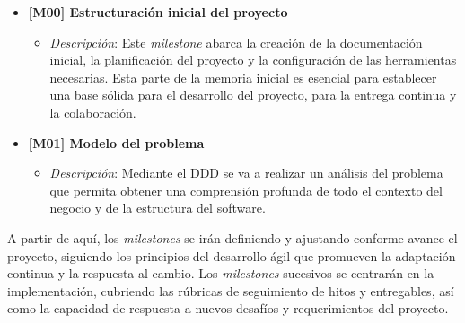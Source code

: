 \begin{itemize}
    \item \textbf{[M00] \- Estructuración inicial del proyecto}
    \begin{itemize}
        \item \textit{Descripción}: Este \textit{milestone} abarca la creación de la documentación inicial, la planificación del proyecto y la configuración de las herramientas necesarias. Esta parte de la memoria inicial es esencial para establecer una base sólida para el desarrollo del proyecto, para la entrega continua y la colaboración.
    \end{itemize}

    \item \textbf{[M01] \- Modelo del problema}
    \begin{itemize}
        \item \textit{Descripción}: Mediante el DDD se va a realizar un análisis del problema que permita obtener una comprensión profunda de todo el contexto del negocio y de la estructura del software.
    \end{itemize}
\end{itemize}

A partir de aquí, los \textit{milestones} se irán definiendo y ajustando conforme avance el proyecto, siguiendo los principios del desarrollo ágil que promueven la adaptación continua y la respuesta al cambio. Los \textit{milestones} sucesivos se centrarán en la implementación, cubriendo las rúbricas de seguimiento de hitos y entregables, así como la capacidad de respuesta a nuevos desafíos y requerimientos del proyecto.
